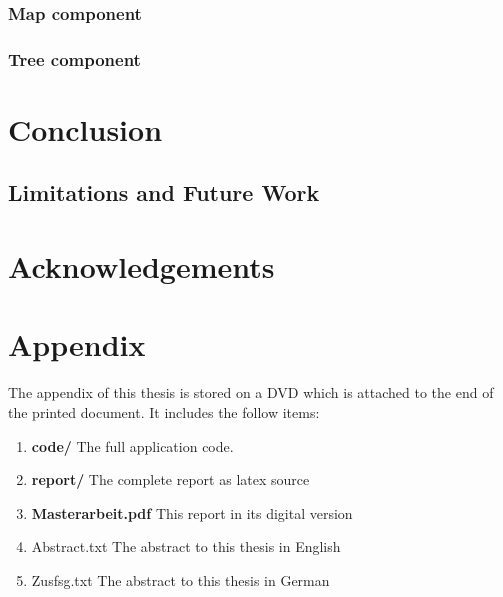 \documentclass[11pt, a4paper,oneside,chapterprefix=false]{scrbook}
\begin{document}
\subsection{Map component} \label{subsec:data_visualization_map}
\subsection{Tree component} \label{subsec:data_visualization_component}
\chapter{Conclusion} \label{chp:discussion_conclusion}



\section{Limitations and Future Work}

\chapter*{Acknowledgements}





\listoffigures
\listoftables
\appendix
\chapter{Appendix}
The appendix of this thesis is stored on a DVD which is attached to the end of the printed document. It includes the follow items: 
\begin{enumerate}
    \item \textbf{code/} The full application code. 
    \item \textbf{report/} The complete report as latex source
    \item \textbf{Masterarbeit.pdf} This report in its digital version
    \item{Abstract.txt} The abstract to this thesis in English
    \item {Zusfsg.txt} The abstract to this thesis in German
\end{enumerate}

\end{document}
